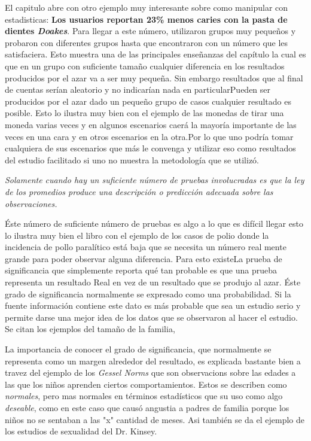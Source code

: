 \documentclass[letterpaper, 11pt]{article}
\begin{document}
El capitulo abre con otro ejemplo muy interesante sobre como manipular con estadisticas: \textbf{Los usuarios reportan 23\% menos caries con la pasta de dientes \textit{Doakes}}. Para llegar a este número, utilizaron grupos muy pequeños y probaron con diferentes grupos hasta que encontraron con un número que les satisfaciera. Esto muestra una de las principales enseñanzas del capítulo la cual es que en un grupo con suficiente tamaño cualquier diferencia en los resultados producidos por el azar va a ser muy pequeña. Sin embargo resultados que al final de cuentas serían aleatorio y no indicarían nada en particularPueden ser producidos por el azar dado un pequeño grupo de casos cualquier resultado es posible. Esto lo ilustra muy bien con el ejemplo de las monedas de tirar una moneda varias veces y en algunos escenarios caerá la mayoría importante de las veces en una cara y en otros escenarios en la otra.Por lo que uno podría tomar cualquiera de sus escenarios que más le convenga y utilizar eso como resultados del estudio facilitado si uno no muestra la metodología que se utilizó.

\textit{Solamente cuando hay un suficiente número de pruebas involucradas es que la ley de los promedios produce una descripción o predicción adecuada sobre las observaciones.}

Éste número de suficiente número de pruebas es algo a lo que es difícil llegar esto lo ilustra muy bien el libro con el ejemplo de los casos de polio donde la incidencia de pollo paralítico está baja que se necesita un número real mente grande para poder observar alguna diferencia. Para esto existeLa prueba de significancia que simplemente reporta qué tan probable es que una prueba representa un resultado Real en vez de un resultado que se produjo al azar. Éste grado de significancia normalmente se expresado como una probabilidad. Si la fuente información contiene este dato es más probable que sea un estudio serio y permite darse una mejor idea de los datos que se observaron al hacer el estudio. Se citan los ejemplos del tamaño de la familia, 

La importancia de conocer el grado de significancia, que normalmente se representa como un margen alrededor del resultado, es explicada bastante bien a travez del ejemplo de los \textit{Gessel Norms} que son observacions sobre las edades a las que los niños aprenden ciertos comportamientos. Estos se describen como \textit{normales}, pero mas normales en términos estadísticos que su uso como algo \textit{deseable}, como en este caso que causó angustia a padres de familia porque los niños no se sentaban a las "x" cantidad de meses. Asi también se da el ejemplo de los estudios de sexualidad del Dr. Kinsey.
\end{document}
